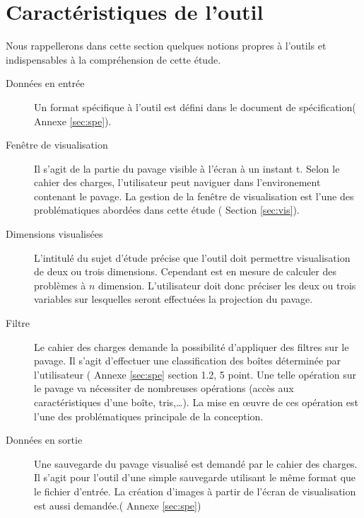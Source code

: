 \section{Caractéristiques de l'outil}
Nous rappellerons dans cette section quelques notions propres à l'outils et indispensables à la compréhension de cette étude.  
\begin{description}
\item[Données en entrée] Un format spécifique à l'outil est défini dans le document de spécification(\cf{} Annexe \ref{sec:spe}).
 \item[Fenêtre de visualisation] Il s'agit de la partie du pavage visible à l'écran à un instant t. Selon le cahier des charges, l'utilisateur peut \og naviguer\fg{} dans l'environement contenant le pavage. La gestion de la fenêtre de visualisation est l'une des problématiques abordées dans cette étude (\cf{} Section \ref{sec:vis}).
\item[Dimensions visualisées] L'intitulé du sujet d'étude précise que l'outil doit permettre visualisation de deux ou trois dimensions. Cependant \realpaver{} est en mesure de calculer des problèmes à $n$ dimension. L'utilisateur doit donc préciser les deux ou trois variables sur lesquelles seront effectuées la projection du pavage.  
\item[Filtre] Le cahier des charges demande la possibilité d'appliquer des filtres sur le pavage. Il s'agit d'effectuer une classification des boîtes déterminée par l'utilisateur (\cf{} Annexe \ref{sec:spe} section 1.2, 5 point. Une telle opération sur le pavage va nécessiter de nombreuses opérations (accès aux caractéristiques d'une boîte, tris,\dots). La mise en œuvre de ces opération est l'une des problématiques principale de la conception.    
\item[Données en sortie] Une sauvegarde du pavage visualisé est demandé par le cahier des charges. Il s'agit pour l'outil d'une simple \og sauvegarde \fg{} utilisant le même format que le fichier d'entrée. La création d'images à partir de l'écran de visualisation est aussi demandée.(\cf{} Annexe \ref{sec:spe})
\end{description}
